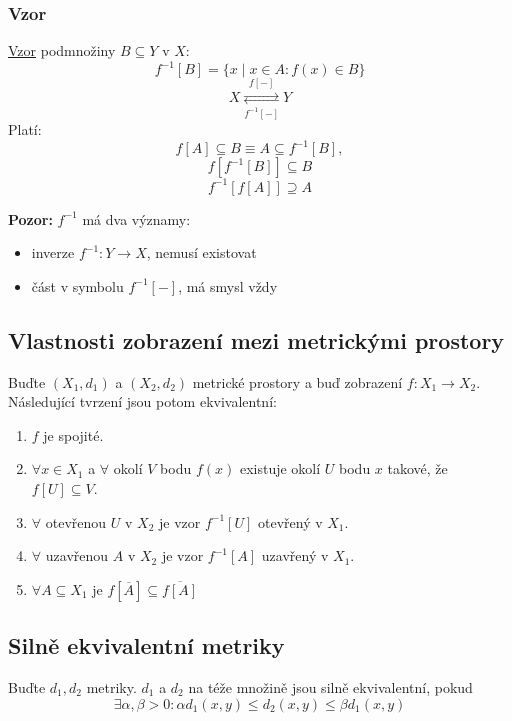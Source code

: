 \documentclass[../main.tex]{subfiles}
\begin{document}
\subsubsection{Vzor}
\hspace{1.2mm}
\underline{Vzor} podmnožiny $B\subseteq Y$ v $X$:
\[f^{-1}[B] = \{x \mid x \in A: f(x) \in B\}\]
\[X \underset{f^{-1}[-]}{\stackrel{f[-]}{\rightleftarrows}} Y\]
\hspace{1.2mm}
Platí:
\[f[A] \subseteq B \equiv A \subseteq f^{-1}[B],\]
\[f[f^{-1}[B]] \subseteq B\]
\[f^{-1}[f[A]] \supseteq A\]

\noindent
\hspace{1.2mm}
\textbf{Pozor:} $f^{-1}$ má dva významy:
\begin{itemize}
    \item inverze $f^{-1}:Y \rightarrow X$, nemusí existovat
    \item část v symbolu $f^{-1}[-]$, má smysl vždy
 
\end{itemize}
\noindent

\subsection{Vlastnosti zobrazení mezi metrickými prostory}
\hspace{1.2mm}
Buďte $(X_1, d_1)$ a $(X_2, d_2)$ metrické prostory a buď zobrazení $f: X_1 \to X_2$. Následující tvrzení
jsou potom ekvivalentní:
\begin{enumerate}
    \item $f$ je spojité.
    \item $\forall x \in X_1$ a $\forall$ okolí $V$ bodu $f(x)$ existuje okolí $U$ bodu $x$ takové, že
        $f[U] \subseteq V$.
    \item $\forall$ otevřenou $U$ v $X_2$ je vzor $f^{-1}[U]$ otevřený v $X_1$.
    \item $\forall$ uzavřenou $A$ v $X_2$ je vzor $f^{-1}[A]$ uzavřený v $X_1$.
    \item $\forall A \subseteq X_1$ je $f[\overline{A}] \subseteq \overline{f[A]}$
\end{enumerate}


\subsection{Silně ekvivalentní metriky}
\hspace{1.2mm}
Buďte $d_1, d_2$ metriky. $d_1$ a $d_2$ na téže množině jsou silně ekvivalentní, pokud
\[\exists \alpha , \beta > 0: \alpha d_1(x,y) \leq d_2(x,y) \leq \beta d_1(x,y)\]
\end{document}
